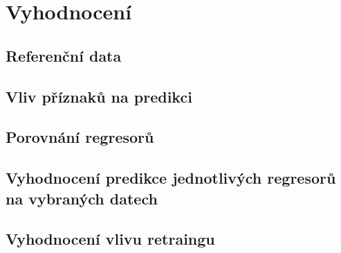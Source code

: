\chapter{Vyhodnocení}
\section{Referenční data}
\section{Vliv příznaků na predikci}
\section{Porovnání regresorů}
\section{Vyhodnocení predikce jednotlivých regresorů na vybraných datech}
\section{Vyhodnocení vlivu retraingu}
